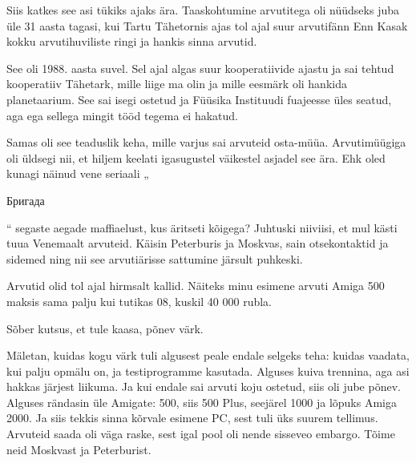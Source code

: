 Siis katkes see asi tükiks ajaks ära. Taaskohtumine arvutitega oli nüüdseks juba üle 31 aasta tagasi, kui Tartu Tähetornis ajas 
tol ajal suur arvutifänn Enn Kasak kokku arvutihuviliste ringi ja hankis sinna 
arvutid.


See oli 1988. aasta suvel. Sel ajal algas suur kooperatiivide ajastu ja sai 
tehtud kooperatiiv Tähetark, mille liige ma olin ja mille 
eesmärk oli hankida planetaarium. See sai isegi ostetud ja 
Füüsika Instituudi fuajeesse üles 
seatud, aga ega sellega mingit tööd tegema ei hakatud. 

Samas oli see teaduslik keha, mille varjus sai arvuteid 
osta-müüa. Arvutimüügiga oli üldsegi nii, et hiljem keelati igasugustel 
väikestel asjadel see ära. Ehk oled kunagi näinud vene seriaali 
„\begin{russian}Бригада\end{russian}“ segaste aegade maffiaelust, kus äritseti 
kõigega? Juhtuski niiviisi, et mul kästi tuua Venemaalt 
arvuteid. Käisin Peterburis ja Moskvas, sain otsekontaktid ja sidemed ning 
nii see arvutiärisse sattumine järsult puhkeski. 

Arvutid olid tol 
ajal hirmsalt kallid. Näiteks minu esimene arvuti Amiga 
500 maksis sama palju kui tutikas 08, kuskil 40 000 rubla.


Sõber kutsus, et tule kaasa, põnev värk.

Mäletan, kuidas kogu värk tuli algusest peale endale selgeks 
teha: kuidas vaadata, kui palju opmälu on, ja testiprogramme kasutada. 
Alguses kuiva trennina, aga asi hakkas järjest liikuma. Ja kui endale 
sai arvuti koju ostetud, siis oli jube põnev. Alguses rändasin üle Amigate: 
500, siis 500 Plus, seejärel 
1000 ja lõpuks Amiga 2000. Ja siis 
tekkis sinna kõrvale esimene PC, sest tuli üks suurem tellimus. Arvuteid saada oli 
väga raske, sest igal pool oli nende sisseveo embargo. 
Tõime neid Moskvast ja 
Peterburist.\label{sisu!veiko_moskvas}

